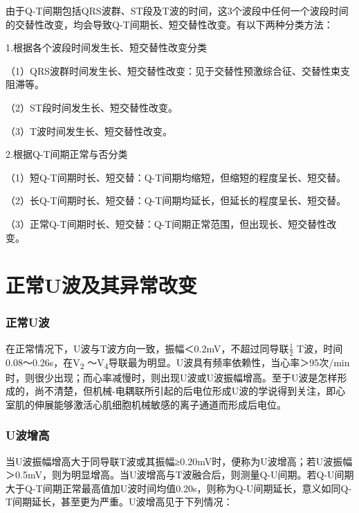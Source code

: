 由于Q-T间期包括QRS波群、ST段及T波的时间，这3个波段中任何一个波段时间的交替性改变，均会导致Q-T间期长、短交替性改变。有以下两种分类方法：

1.根据各个波段时间发生长、短交替性改变分类

（1）QRS波群时间发生长、短交替性改变：见于交替性预激综合征、交替性束支阻滞等。

（2）ST段时间发生长、短交替性改变。

（3）T波时间发生长、短交替性改变。

2.根据Q-T间期正常与否分类

（1）短Q-T间期时长、短交替：Q-T间期均缩短，但缩短的程度呈长、短交替。

（2）长Q-T间期时长、短交替：Q-T间期均延长，但延长的程度呈长、短交替。

（3）正常Q-T间期时长、短交替：Q-T间期正常范围，但出现长、短交替性改变。

\protect\hypertarget{text00014.html}{}{}

\protect\hypertarget{text00014.htmlux5cux23chapter14}{}{}

\chapter{正常U波及其异常改变}

\protect\hypertarget{text00014.htmlux5cux23subid109}{}{}

\subsection{正常U波}

在正常情况下，U波与T波方向一致，振幅＜0.2mV，不超过同导联$\frac{1}{2}$
T波，时间0.08～0.26s，在V\textsubscript{2} ～V\textsubscript{4}导联最为明显。U波具有频率依赖性，当心率＞95次/min时，则很少出现；而心率减慢时，则出现U波或U波振幅增高。至于U波是怎样形成的，尚不清楚，但机械-电耦联所引起的后电位形成U波的学说得到关注，即心室肌的伸展能够激活心肌细胞机械敏感的离子通道而形成后电位。

\protect\hypertarget{text00014.htmlux5cux23subid110}{}{}

\subsection{U波增高}

当U波振幅增高大于同导联T波或其振幅≥0.20mV时，便称为U波增高；若U波振幅＞0.5mV，则为明显增高。当U波增高与T波融合后，则测量Q-U间期。若Q-U间期大于Q-T间期正常最高值加U波时间均值0.20s，则称为Q-U间期延长，意义如同Q-T间期延长，甚至更为严重。U波增高见于下列情况：

